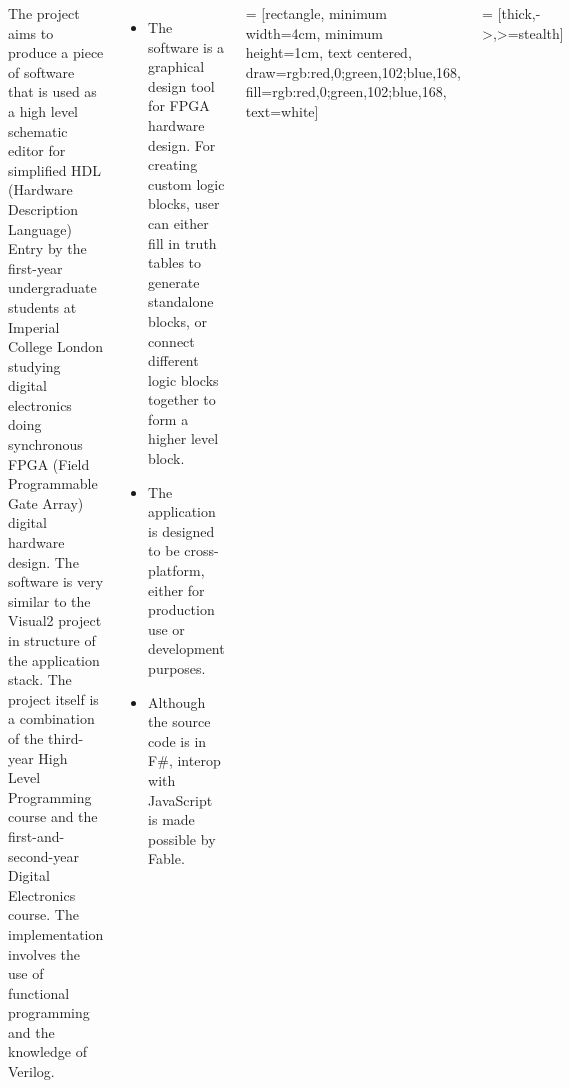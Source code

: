 \documentclass[12pt, a1paper, landscape, margin=10mm, innermargin=15mm, blockverticalspace=15mm, colspace=15mm, subcolspace=8mm]{tikzposter}
\newcommand*\circled[1]{\tikz[baseline=(char.base)]{
            \node[shape=circle,draw,inner sep=1pt] (char) {#1};}}
\begin{document}
\begin{columns}
    {The project aims to produce a piece of software that is used as a high level schematic editor for simplified HDL (Hardware Description Language) Entry by the first-year undergraduate students at Imperial College London studying digital electronics doing synchronous FPGA (Field Programmable Gate Array) digital hardware design. The software is very similar to the Visual2 project in structure of the application stack. The project itself is a combination of the third-year High Level Programming course and the first-and-second-year Digital Electronics course. The implementation involves the use of functional programming and the knowledge of Verilog.}
    
    {
    
\begin{itemize}
    \item The software is a graphical design tool for FPGA hardware design. For creating custom logic blocks, user can either fill in truth tables to generate standalone blocks, or connect different logic blocks together to form a higher level block.
    \item The application is designed to be cross-platform, either for production use or development purposes.
    \item Although the source code is in F\#, interop with JavaScript is made possible by Fable.
\end{itemize}
    }
    
    {
 = [rectangle, minimum width=4cm, minimum height=1cm, text centered, draw={rgb:red,0;green,102;blue,168}, fill={rgb:red,0;green,102;blue,168}, text=white]

 = [thick,->,>=stealth]

}
\end{columns}
\end{document}
